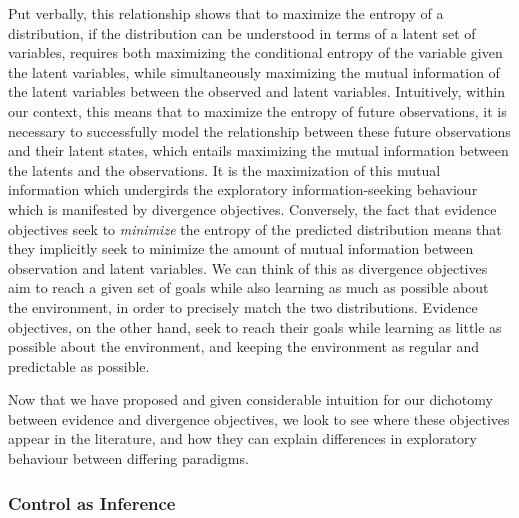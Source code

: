 Put verbally, this relationship shows that to maximize the entropy of a distribution, if the distribution can be understood in terms of a latent set of variables, requires both maximizing the conditional entropy of the variable given the latent variables, while simultaneously maximizing the mutual information of the latent variables between the observed and latent variables. Intuitively, within our context, this means that to maximize the entropy of future observations, it is necessary to successfully model the relationship between these future observations and their latent states, which entails maximizing the mutual information between the latents and the observations. It is the maximization of this mutual information which undergirds the exploratory information-seeking behaviour which is manifested by divergence objectives. Conversely, the fact that evidence objectives seek to \emph{minimize} the entropy of the predicted distribution means that they implicitly seek to minimize the amount of mutual information between observation and latent variables. We can think of this as divergence objectives aim to reach a given set of goals while also learning as much as possible about the environment, in order to precisely match the two distributions. Evidence objectives, on the other hand, seek to reach their goals while learning as little as possible about the environment, and keeping the environment as regular and predictable as possible. 

Now that we have proposed and given considerable intuition for our dichotomy between evidence and divergence objectives, we look to see where these objectives appear in the literature, and how they can explain differences in exploratory behaviour between differing paradigms.

\subsubsection{Control as Inference}

